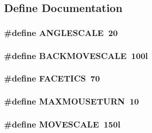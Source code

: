 \subsection{Define Documentation}
\hypertarget{WL__AGENT_8C_a3ab7501145c7f7bd3f4c5c76589e5863}{
\subsubsection[{ANGLESCALE}]{\setlength{\rightskip}{0pt plus 5cm}\#define ANGLESCALE~20}}
\label{WL__AGENT_8C_a3ab7501145c7f7bd3f4c5c76589e5863}
\hypertarget{WL__AGENT_8C_ae0376bd5f21024fe8205b6d59d54e6d9}{
\subsubsection[{BACKMOVESCALE}]{\setlength{\rightskip}{0pt plus 5cm}\#define BACKMOVESCALE~100l}}
\label{WL__AGENT_8C_ae0376bd5f21024fe8205b6d59d54e6d9}
\hypertarget{WL__AGENT_8C_ada7d88a2854f689de2c9cccf791e44eb}{
\subsubsection[{FACETICS}]{\setlength{\rightskip}{0pt plus 5cm}\#define FACETICS~70}}
\label{WL__AGENT_8C_ada7d88a2854f689de2c9cccf791e44eb}
\hypertarget{WL__AGENT_8C_adb1a33704348cfb6b7e24b5adbae7598}{
\subsubsection[{MAXMOUSETURN}]{\setlength{\rightskip}{0pt plus 5cm}\#define MAXMOUSETURN~10}}
\label{WL__AGENT_8C_adb1a33704348cfb6b7e24b5adbae7598}
\hypertarget{WL__AGENT_8C_addd337c4e652effc84b749baf914107b}{
\subsubsection[{MOVESCALE}]{\setlength{\rightskip}{0pt plus 5cm}\#define MOVESCALE~150l}}
\label{WL__AGENT_8C_addd337c4e652effc84b749baf914107b}



